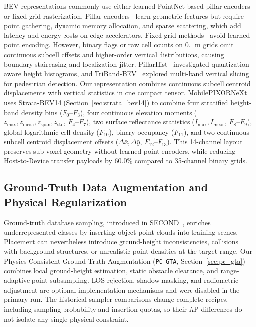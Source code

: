 BEV representations commonly use either learned PointNet-based pillar encoders or fixed-grid rasterization. Pillar encoders~\cite{lang2019pointpillars,li2023pillarnext} learn geometric features but require point gathering, dynamic memory allocation, and sparse scattering, which add latency and energy costs on edge accelerators. Fixed-grid methods~\cite{yang2018pixor,nguyen2024indoor} avoid learned point encoding. However, binary flags or raw cell counts on $0.1\,\text{m}$ grids omit continuous subcell offsets and higher-order vertical distributions, causing boundary staircasing and localization jitter. PillarHist~\cite{zhou2025pillarhist} investigated quantization-aware height histograms, and TriBand-BEV~\cite{khoshkdahan2026triband} explored multi-band vertical slicing for pedestrian detection. Our representation combines continuous subcell centroid displacements with vertical statistics in one compact tensor. MobilePIXORNeXt uses Strata-BEV14 (Section~\ref{sec:strata_bev14}) to combine four stratified height-band density bins ($F_0$--$F_3$), four continuous elevation moments ($z_{\max}, z_{\mathrm{mean}}, z_{\mathrm{span}}, z_{\mathrm{std}}$, $F_4$--$F_7$), two surface reflectance statistics ($I_{\max}, I_{\mathrm{mean}}$, $F_8$--$F_9$), global logarithmic cell density ($F_{10}$), binary occupancy ($F_{11}$), and two continuous subcell centroid displacement offsets $(\Delta\bar{x}, \Delta\bar{y}$, $F_{12}$--$F_{13}$). This 14-channel layout preserves sub-voxel geometry without learned point encoders, while reducing Host-to-Device transfer payloads by $60.0\%$ compared to 35-channel binary grids.

\subsection{Ground-Truth Data Augmentation and Physical Regularization}
\label{sec:rel_gt_augmentation}

Ground-truth database sampling, introduced in SECOND~\cite{yan2018second}, enriches underrepresented classes by inserting object point clouds into training scenes. Placement can nevertheless introduce ground-height inconsistencies, collisions with background structures, or unrealistic point densities at the target range. Our Physics-Consistent Ground-Truth Augmentation (\texttt{PC-GTA}, Section~\ref{sec:pc_gta}) combines local ground-height estimation, static obstacle clearance, and range-adaptive point subsampling. LOS rejection, shadow masking, and radiometric adjustment are optional implementation mechanisms and were disabled in the primary run. The historical sampler comparisons change complete recipes, including sampling probability and insertion quotas, so their AP differences do not isolate any single physical constraint.

